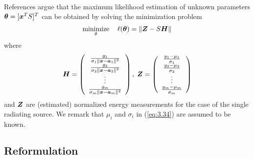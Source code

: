 References \cite{LiHu,ShengHu} argue that the maximum likelihood estimation of unknown parameters $\mbox{\boldmath${\theta}$} = [\mbox{\boldmath$x$}^T S]^T$ can be obtained by solving the minimization problem
\begin{equation} \label{eq:3.34}
\mathop{\mbox{minimize}}_\theta \quad \ell(\mbox{\boldmath${\theta}$}) = \|\mbox{\boldmath$Z$} - S\mbox{\boldmath$H$}\|
\end{equation}
where 
\begin{equation}
\nonumber
\mbox{\boldmath$H$} = \left( \begin{array}{c}
\frac{g_1}{\sigma_1\|\boldsymbol{x} - \boldsymbol{a}_1 \|^2} \\
\frac{g_2}{\sigma_2\|\boldsymbol{x} - \boldsymbol{a}_2 \|^2} \\
\vdots \\
\frac{g_m}{\sigma_m\|\boldsymbol{x} - \boldsymbol{a}_m \|^2} \\
\end{array}
\right) , \;
\nonumber
\mbox{\boldmath$Z$} = \left( \begin{array}{c}
\frac{y_1 - \mu_1}{\sigma_1} \\
\frac{y_2 - \mu_2}{\sigma_2} \\
\vdots \\
\frac{y_m - \mu_m}{\sigma_m} \\
\end{array}
\right)
\end{equation}
and $\mbox{\boldmath$Z$}$ are (estimated) normalized energy measurements for the case of the single radiating source. We remark that $\mu_i$ and $\sigma_i$ in (\ref{eq:3.34}) are assumed to be known. 


\subsection{Reformulation}

